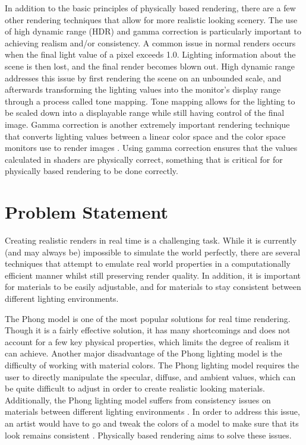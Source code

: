 \documentclass[12pt, letterpaper, twocolumn]{article}
\begin{document}
In addition to the basic principles of physically based rendering, there are a
few other rendering techniques that allow for more realistic looking scenery.
The use of high dynamic range (HDR) and gamma correction is particularly
important to achieving realism and/or consistency. A common issue in normal
renders occurs when the final light value of a pixel exceeds 1.0. Lighting
information about the scene is then lost, and the final render becomes blown
out. High dynamic range addresses this issue by first rendering the scene on
an unbounded scale, and afterwards transforming the lighting values into the
monitor’s display range through a process called tone mapping\cite{HiDy}. Tone
mapping allows for the lighting to be scaled down into a displayable range
while still having control of the final image. Gamma correction is another
extremely important rendering technique that converts lighting values between
a linear color space and the color space monitors use to render images
\cite{GamCo}. Using gamma correction ensures that the values calculated in
shaders are physically correct, something that is critical for for physically
based rendering to be done correctly.

\section{Problem Statement}

Creating realistic renders in real time is a challenging task. While it is
currently (and may always be) impossible to simulate the world perfectly,
there are several techniques that attempt to emulate real world properties in
a computationally efficient manner whilst still preserving render quality. In
addition, it is important for materials to be easily adjustable, and for
materials to stay consistent between different lighting environments.

The Phong model is one of the most popular solutions for real time rendering.
Though it is a fairly effective solution, it has many shortcomings and does
not account for a few key physical properties, which limits the degree of
realism it can achieve. Another major disadvantage of the Phong lighting model
is the difficulty of working with material colors. The Phong lighting model
requires the user to directly manipulate the specular, diffuse, and ambient
values, which can be quite difficult to adjust in order to create realistic
looking materials. Additionally, the Phong lighting model suffers from
consistency issues on materials between different lighting environments
\cite{lerpGL}. In order to address this issue, an artist would have to go and
tweak the colors of a model to make sure that its look remains consistent
\cite{lerpGL}. Physically based rendering aims to solve these issues.
\end{document}
